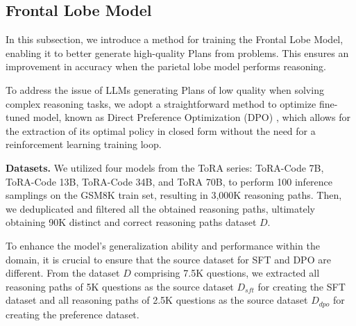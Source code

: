 \documentclass[11pt]{article}
\begin{document}
\subsection{Frontal Lobe Model}
\label{subsec:3.3}


In this subsection, we introduce a method for training the Frontal Lobe Model, enabling it to better generate high-quality Plans from problems. This ensures an improvement in accuracy when the parietal lobe model performs reasoning.


To address the issue of LLMs generating Plans of low quality when solving complex reasoning tasks, we adopt a straightforward method to optimize fine-tuned model, known as Direct Preference Optimization (DPO) \citep{rafailovDirectPreferenceOptimization2023}, which allows for the extraction of its optimal policy in closed form without the need for a reinforcement learning training loop.


\textbf{Datasets.} We utilized four models from the ToRA series: ToRA-Code 7B, ToRA-Code 13B, ToRA-Code 34B, and ToRA 70B, to perform 100 inference samplings on the GSM8K train set, resulting in 3,000K reasoning paths. Then, we deduplicated and filtered all the obtained reasoning paths, ultimately obtaining 90K distinct and correct reasoning paths dataset $D$.


To enhance the model's generalization ability and performance within the domain, it is crucial to ensure that the source dataset for SFT and DPO are different. From the dataset $D$ comprising 7.5K questions, we extracted all reasoning paths of 5K questions as the source dataset $D_{sft}$ for creating the SFT dataset and all reasoning paths of 2.5K questions as the source dataset $D_{dpo}$ for creating the preference dataset.
\end{document}
